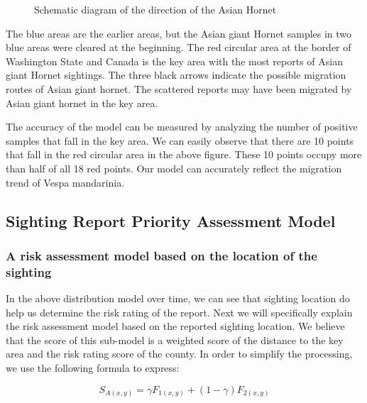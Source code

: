 \documentclass{mcmthesis}
\numberwithin{figure}{section}
\numberwithin{table}{section}
\begin{document}
\begin{figure}[H]
  \caption{Schematic diagram of the direction of the Asian Hornet}\label{1_4}
\end{figure}

The blue areas are the earlier areas, but the Asian giant Hornet samples in two blue areas were cleared at the beginning. The red circular area at the border of  Washington State and Canada is the key area with the most reports of Asian giant Hornet sightings. The three black arrows indicate the possible migration routes of Asian giant hornet. The scattered reports may have been migrated by Asian giant hornet in the key area. 

The accuracy of the model can be measured by analyzing the number of positive samples that fall in the key area. We can easily observe that there are 10 points that fall in the red circular area in the above figure. These 10 points occupy more than half of all 18 red points. Our model can accurately reflect the migration trend of Vespa mandarinia.

\subsection{Sighting Report Priority Assessment Model}
\subsubsection{A risk assessment model based on the location of the sighting}
In the above distribution model over time, we can see that sighting location do help us determine the risk rating of the report. Next we will specifically explain the risk assessment model based on the reported sighting location. We believe that the score of this sub-model is a weighted score of the distance to the key area and the risk rating score of the county. In order to simplify the processing, we use the following formula to express:

\begin{equation}
    S_{A(x,y)} = \gamma F_{1(x,y)}+ (1-\gamma) F_{2(x,y)}
\end{equation}
\end{document}
